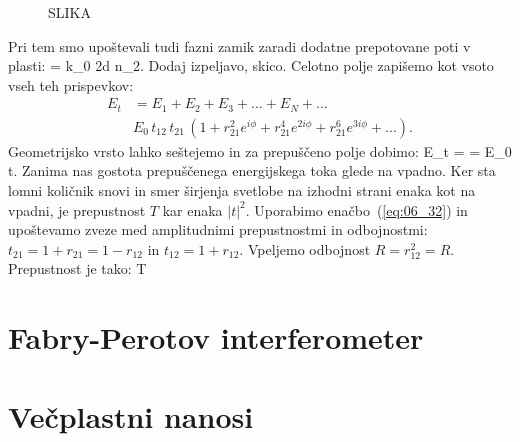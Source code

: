\begin{figure}[ht]
\centering
\def\svgwidth{140truemm} 
%
\caption{SLIKA}
\label{fig:06_Nrez}
\end{figure}

Pri tem smo upoštevali tudi fazni zamik zaradi dodatne prepotovane poti v plasti:
\beq
\phi = k_0 2d \cos \beta n_2.
\label{eq:06_31}
\eeq
Dodaj izpeljavo, skico. 
Celotno polje zapišemo kot vsoto vseh teh prispevkov:
\begin{align}
E_t &= E_1+E_2+E_3+... + E_N + ... \\
& E_0\, t_{12}\,t_{21}\,\left(1 + r_{21}^2 e^{i\phi} + r_{21}^4 e^{2i\phi} + r_{21}^6 e^{3i\phi} + ... \right).
\label{eq:06_30}
\end{align}
Geometrijsko vrsto lahko seštejemo in za prepuščeno polje dobimo:
\beq
E_t =  = E_0 t.
\label{eq:06_32}
\eeq
Zanima nas gostota prepuščenega energijskega toka glede na vpadno. Ker sta lomni količnik snovi
in smer širjenja svetlobe na izhodni strani enaka kot na vpadni, je prepustnost $T$ kar enaka $|t|^2$.
Uporabimo enačbo~(\ref{eq:06_32}) in upoštevamo zveze med amplitudnimi prepustnostmi in odbojnostmi:
$t_{21} = 1+r_{21} = 1-r_{12}$ in $t_{12} = 1+r_{12}$. Vpeljemo odbojnost $R = r_{12}^2 = R$.
Prepustnost je tako:
\beq
T
\label{eq:06_33}
\eeq



\section{Fabry-Perotov interferometer}

\section{Večplastni nanosi}
